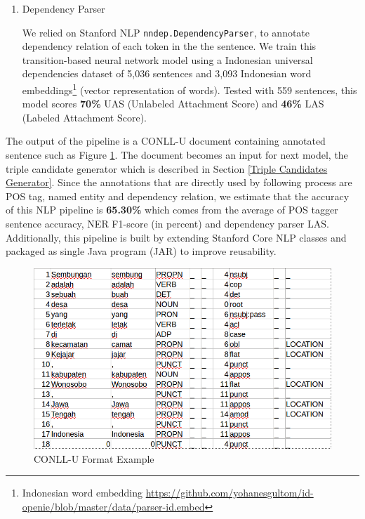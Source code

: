 \documentclass[conference,compsoc,12pt]{IEEEtran}
\begin{document}
\begin{enumerate}
\item Dependency Parser

We relied on Stanford NLP \verb|nndep.DependencyParser|\cite{chen2014fast}, to annotate dependency relation of each token in the the sentence. We train this transition-based neural network model using a Indonesian universal dependencies dataset of 5,036 sentences and 3,093 Indonesian word embeddings\footnote{Indonesian word embedding \url{https://github.com/yohanesgultom/id-openie/blob/master/data/parser-id.embed}} (vector representation of words). Tested with 559 sentences, this model scores \textbf{70\%} UAS (Unlabeled Attachment Score) and \textbf{46\%} LAS (Labeled Attachment Score).

\end{enumerate}

The output of the pipeline is a CONLL-U document containing annotated sentence such as Figure \ref{fig_conllu_example}. The document becomes an input for next model, the triple candidate generator which is described in Section \ref{Triple Candidates Generator}. Since the annotations that are directly used by following process are POS tag, named entity and dependency relation, we estimate that the accuracy of this NLP pipeline is \textbf{65.30\%} which comes from the average of POS tagger sentence accuracy, NER F1-score (in percent) and dependency parser LAS. Additionally, this pipeline is built by extending Stanford Core NLP classes and packaged as single Java program (JAR) to improve reusability.

\begin{figure}
\centering
\includegraphics[scale=0.35]{../images/conllu_example.png}
\caption{CONLL-U Format Example}
\label{fig_conllu_example}
\end{figure}
\end{document}
